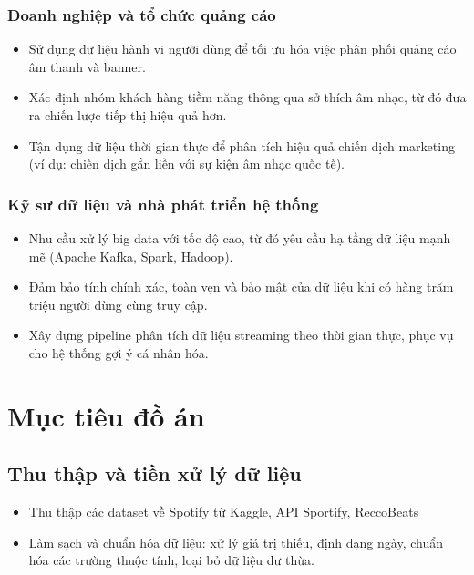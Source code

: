 \documentclass{../hcmut-report}
\begin{document}
\subsubsection{Doanh nghiệp và tổ chức quảng cáo}
\begin{itemize}
    \item Sử dụng dữ liệu hành vi người dùng để tối ưu hóa việc phân phối quảng cáo âm thanh và banner.

    \item Xác định nhóm khách hàng tiềm năng thông qua sở thích âm nhạc, từ đó đưa ra chiến lược tiếp thị hiệu quả hơn.

    \item Tận dụng dữ liệu thời gian thực để phân tích hiệu quả chiến dịch marketing (ví dụ: chiến dịch gắn liền với sự kiện âm nhạc quốc tế).
\end{itemize}

\subsubsection{Kỹ sư dữ liệu và nhà phát triển hệ thống}
\begin{itemize}
    \item Nhu cầu xử lý big data với tốc độ cao, từ đó yêu cầu hạ tầng dữ liệu mạnh mẽ (Apache Kafka, Spark, Hadoop).

    \item Đảm bảo tính chính xác, toàn vẹn và bảo mật của dữ liệu khi có hàng trăm triệu người dùng cùng truy cập.

    \item Xây dựng pipeline phân tích dữ liệu streaming theo thời gian thực, phục vụ cho hệ thống gợi ý cá nhân hóa.
\end{itemize}

\section{Mục tiêu đồ án}

\subsection{Thu thập và tiền xử lý dữ liệu}
\begin{itemize}
    \item Thu thập các dataset về Spotify từ Kaggle, API Sportify, ReccoBeats
    \item Làm sạch và chuẩn hóa dữ liệu: xử lý giá trị thiếu, định dạng ngày, chuẩn hóa các trường thuộc tính, loại bỏ dữ liệu dư thừa.
\end{itemize}
\end{document}
